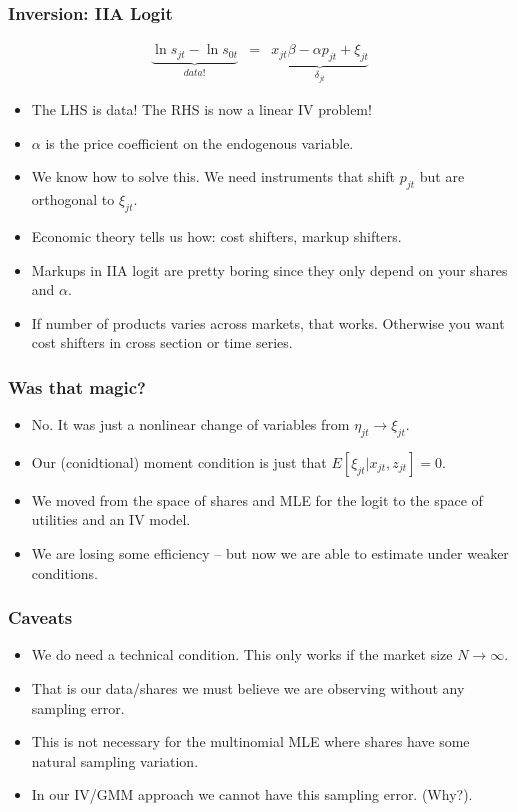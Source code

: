 \documentclass[aspectratio=169,11pt]{beamer}
\begin{document}
\begin{frame}
\frametitle{Inversion: IIA Logit}
\begin{eqnarray*}
\underbrace{\ln s_{jt}- \ln s_{0t}}_{data!}&=& \underbrace{x_{jt} \beta -\alpha p_{jt} +  \xi_{jt}}_{\delta_{jt}}
\end{eqnarray*}
 \begin{itemize}
\item The LHS is data! The RHS is now a linear IV problem!
\item $\alpha$ is the price coefficient on the endogenous variable.
\item We know how to solve this. We need instruments that shift $p_{jt}$ but are orthogonal to $\xi_{jt}$.
\item Economic theory tells us how: cost shifters, markup shifters.
\item Markups in IIA logit are pretty boring since they only depend on your shares and $\alpha$.
\item If number of products varies across markets, that works. Otherwise you want cost shifters in cross section or time series.
 \end{itemize}
\end{frame}


\begin{frame}
\frametitle{Was that magic?}
\begin{itemize}
\item No. It was just a nonlinear change of variables from $\eta_{jt} \rightarrow \xi_{jt}$.
\item Our (conidtional) moment condition is just that $E[\xi_{jt} | x_{jt}, z_{jt}]=0$.
\item We moved from the space of shares and MLE for the logit to the space of utilities and an IV model.
\item We are losing some efficiency -- but now we are able to estimate under weaker conditions.
 \end{itemize}
\end{frame}

\begin{frame}
\frametitle{Caveats}
\begin{itemize}
\item We do need a technical condition. This only works if the market size $N \rightarrow \infty$.
\item That is our data/shares we must believe we are observing without any sampling error.
\item This is not necessary for the multinomial MLE where shares have some natural sampling variation.
\item In our IV/GMM approach we cannot have this sampling error. (Why?).
 \end{itemize}
\end{frame}
\end{document}
